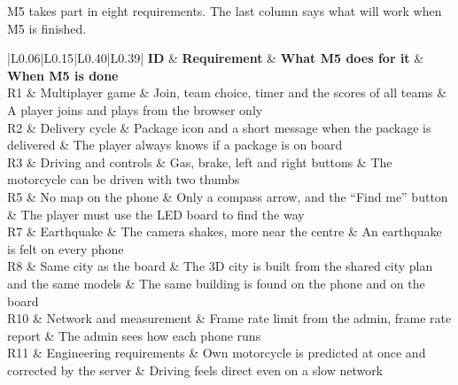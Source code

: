 \documentclass[
  english,
  10pt,
  a4paper,
]{article}
\newcommand{\ckkeep}[1]{\par\noindent\begin{minipage}{\linewidth}\setlength{\parskip}{4pt}#1\end{minipage}\par\smallskip}
\begin{document}
\ckkeep{%
M5 takes part in eight requirements. The last column says what will work when M5 is finished.

\begin{tabular}{|L{0.06}|L{0.15}|L{0.40}|L{0.39}|}
\hline \textbf{ID} & \textbf{Requirement} & \textbf{What M5 does for it} & \textbf{When M5 is done} \\ \hline 
R1 & Multiplayer game & Join, team choice, timer and the scores of all teams & A player joins and plays from the browser only \\ \hline
R2 & Delivery cycle & Package icon and a short message when the package is delivered & The player always knows if a package is on board \\ \hline
R3 & Driving and controls & Gas, brake, left and right buttons & The motorcycle can be driven with two thumbs \\ \hline
R5 & No map on the phone & Only a compass arrow, and the ``Find me'' button & The player must use the LED board to find the way \\ \hline
R7 & Earthquake & The camera shakes, more near the centre & An earthquake is felt on every phone \\ \hline
R8 & Same city as the board & The 3D city is built from the shared city plan and the same models & The same building is found on the phone and on the board \\ \hline
R10 & Network and measurement & Frame rate limit from the admin, frame rate report & The admin sees how each phone runs \\ \hline
R11 & Engineering requirements & Own motorcycle is predicted at once and corrected by the server & Driving feels direct even on a slow network \\ \hline
\end{tabular}}

\end{document}
